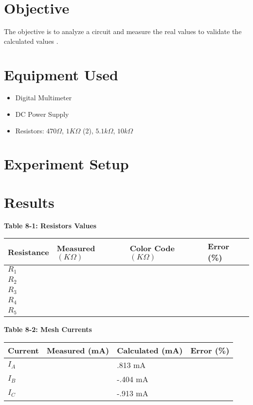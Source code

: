 \documentclass[a4paper]{article}
\begin{document}
\section{Objective}
The objective is to analyze a circuit and measure the real values to validate the calculated values \cite{UNCC-ECE-Dept:2023}.
\section{Equipment Used}

\begin{itemize}
    \item Digital Multimeter
    \item DC Power Supply
    \item Resistors: $470\Omega$, $1K\Omega$ (2), $5.1k\Omega$, $10k\Omega$ 
\end{itemize}

\section{Experiment Setup}



\section{Results}

\begin{center}
    \small\textbf{Table 8-1: Resistors Values \cite{UNCC-ECE-Dept:2023}}
    \begin{tabular}{|p{3 cm}|p{3cm}|p{3 cm}|p{3 cm}|}
        \hline
        Resistance & Measured $(K\Omega)$ & Color Code $(K\Omega)$ & Error (\%) \\
        \hline
        $R_{1}$ & & &  \\
        \hline
        $R_{2}$ & & &  \\
        \hline
        $R_{3}$ & & &  \\
        \hline
        $R_{4}$ & & &  \\
        \hline
        $R_{5}$ & & &  \\
        \hline
    \end{tabular}
\end{center}

\begin{center}
    \small\textbf{Table 8-2: Mesh Currents \cite{UNCC-ECE-Dept:2023}}
    \begin{tabular}{|p{3 cm}|p{3cm}|p{3 cm}|p{3 cm}|}
        \hline
        Current & Measured (mA) & Calculated (mA) & Error (\%) \\
        \hline
        $I_{A}$ & & .813 mA &  \\
        \hline
        $I_{B}$ & & -.404 mA &  \\
        \hline
        $I_{C}$ & & -.913 mA &  \\
        \hline
    \end{tabular}
\end{center}
\end{document}
